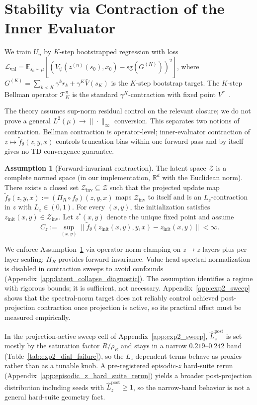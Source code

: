 \documentclass{article}
\theoremstyle{plain}
\theoremstyle{definition}
\newtheorem{assumption}[theorem]{Assumption}
\theoremstyle{remark}
\newcommand{\E}{\mathbb{E}}
\newcommand{\ZZ}{\mathcal{Z}}
\begin{document}
\section{Stability via Contraction of the Inner Evaluator}
\label{sec:contraction}
We train $U_n$ by $K$-step bootstrapped regression with loss $\mathcal{L}_{\mathrm{val}}=\E_{s_0\sim\mu}[(V_\psi(z^{(n)}(s_0),x_0)-\mathrm{sg}(G^{(K)}))^2]$, where $G^{(K)}=\sum_{k<K}\gamma^k r_k + \gamma^K \bar V(s_K)$ is the $K$-step bootstrap target. The $K$-step Bellman operator $\mathcal T^\pi_K$ is the standard $\gamma^K$-contraction with fixed point $V^\pi$~\citep{SuttonBarto2018,Puterman1994}.

The theory assumes sup-norm residual control on the relevant closure; we do not prove a general $L^2(\mu)\to\|\cdot\|_\infty$ conversion. This separates two notions of contraction. Bellman contraction is operator-level; inner-evaluator contraction of $z\mapsto\tilde f_\theta(z,y,x)$ controls truncation bias within one forward pass and by itself gives no TD-convergence guarantee.

\begin{assumption}[Forward-invariant contraction]
\label{ass:Lip}
The latent space $\ZZ$ is a complete normed space (in our implementation, $\mathbb R^d$ with the Euclidean norm). There exists a closed set $\mathcal{Z}_{\mathrm{inv}}\subseteq\ZZ$ such that the projected update map $\tilde f_\theta(z,y,x):=(\Pi_R\circ f_\theta)(z,y,x)$ maps $\mathcal{Z}_{\mathrm{inv}}$ to itself and is an $L_z$-contraction in $z$ with $L_z\in(0,1)$.
For every $(x,y)$, the initialization satisfies $z_{\mathrm{init}}(x,y)\in\mathcal{Z}_{\mathrm{inv}}$.
Let $z^*(x,y)$ denote the unique fixed point and assume
\[
C_z:=\sup_{(x,y)}\|\tilde f_\theta(z_{\mathrm{init}}(x,y),y,x)-z_{\mathrm{init}}(x,y)\|<\infty.
\]
\end{assumption}

We enforce Assumption~\ref{ass:Lip} via operator-norm clamping on $z\!\to\!z$ layers plus per-layer scaling; $\Pi_R$ provides forward invariance. Value-head spectral normalization is disabled in contraction sweeps to avoid confounds (Appendix~\ref{app:latent_collapse_diagnostic}). The assumption identifies a regime with rigorous bounds; it is sufficient, not necessary. Appendix~\ref{app:exp2_sweep} shows that the spectral-norm target does not reliably control achieved post-projection contraction once projection is active, so its practical effect must be measured empirically.

In the projection-active sweep cell of Appendix~\ref{app:exp2_sweep}, $\hat L_z^{\mathrm{post}}$ is set mostly by the saturation factor $R/\rho_R$ and stays in a narrow $0.219$--$0.242$ band (Table~\ref{tab:exp2_dial_failure}), so the $L_z$-dependent terms behave as proxies rather than as a tunable knob. A pre-registered episodic-$z$ hard-suite rerun (Appendix~\ref{app:episodic_z_hard_suite_rerun}) yields a broader post-projection distribution including seeds with $\hat L_z^{\mathrm{post}}\ge 1$, so the narrow-band behavior is not a general hard-suite geometry fact.
\end{document}
